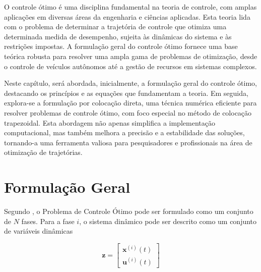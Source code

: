 
O controle ótimo é uma disciplina fundamental na teoria de controle, com amplas aplicações em diversas áreas da engenharia e ciências aplicadas. Esta teoria lida com o problema de determinar a trajetória de controle que otimiza uma determinada medida de desempenho, sujeita às dinâmicas do sistema e às restrições impostas. A formulação geral do controle ótimo fornece uma base teórica robusta para resolver uma ampla gama de problemas de otimização, desde o controle de veículos autônomos até a gestão de recursos em sistemas complexos.

Neste capítulo, será abordada, inicialmente, a formulação geral do controle ótimo, destacando os princípios e as equações que fundamentam a teoria. Em seguida, explora-se a formulação por colocação direta, uma técnica numérica eficiente para resolver problemas de controle ótimo, com foco especial no método de colocação trapezoidal. Esta abordagem não apenas simplifica a implementação computacional, mas também melhora a precisão e a estabilidade das soluções, tornando-a uma ferramenta valiosa para pesquisadores e profissionais na área de otimização de trajetórias.

\section{Formulação Geral}
\label{sec:formulação-geral}

Segundo \cite{betts_practical_2010}, o Problema de Controle Ótimo pode ser formulado como um conjunto de $N$ fases. Para a fase $i$, o sistema dinâmico pode ser descrito como um conjunto de variáveis dinâmicas

\begin{equation*}
    \mathbf{z} = \left[
        \begin{aligned}
            \mathbf{x}^{(i)}(t) \\
            \mathbf{u}^{(i)}(t)
        \end{aligned}
    \right]
\end{equation*}

